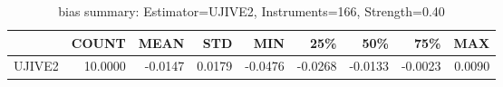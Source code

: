 \begin{table}[ht]
\centering
\caption{bias summary: Estimator=UJIVE2, Instruments=166, Strength=0.40}
\begin{tabular}{lrrrrrrrr}
\toprule
 & COUNT & MEAN & STD & MIN & 25\% & 50\% & 75\% & MAX \\
\midrule
UJIVE2 & 10.0000 & -0.0147 & 0.0179 & -0.0476 & -0.0268 & -0.0133 & -0.0023 & 0.0090 \\
\bottomrule
\end{tabular}
\end{table}
